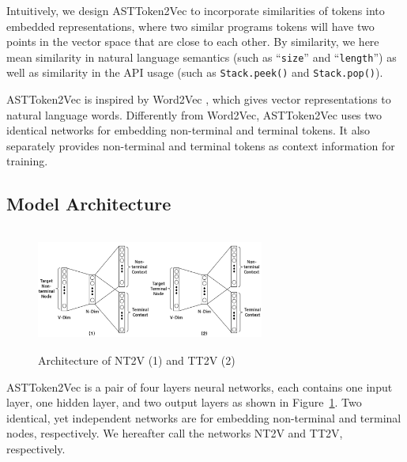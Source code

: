 \documentclass[E]{compsoft}
\begin{document}
Intuitively, we design ASTToken2Vec to incorporate similarities of tokens into embedded representations, where two similar programs tokens will have two points in the vector space that are close to each other.  By similarity, we here mean similarity in natural language semantics (such as ``\texttt{size}'' and ``\texttt{length}'') as well as similarity in the API usage (such as \texttt{Stack.peek()} and \texttt{Stack.pop()}).

ASTToken2Vec is inspired by Word2Vec \cite{word2vec}, which gives vector representations to natural language words. Differently from Word2Vec, ASTToken2Vec 
uses two identical networks for embedding non-terminal and terminal tokens.  It also separately provides non-terminal and terminal tokens as context information for training.



\subsection{Model Architecture}
\begin{figure}[!ht]
\centering
\includegraphics[width=7.5cm, height=4cm]{pictures/node2vec_structure.png}
\caption{Architecture of NT2V (1) and TT2V (2)}
\label{fig:node2vec-structure}
\end{figure}
ASTToken2Vec is a pair of four layers neural networks, each contains one input layer, one hidden layer, and two output layers as shown in Figure~\ref{fig:node2vec-structure}.  Two identical, yet independent networks are for embedding non-terminal and terminal nodes, respectively.  We hereafter call the networks NT2V and TT2V, respectively.
\end{document}
